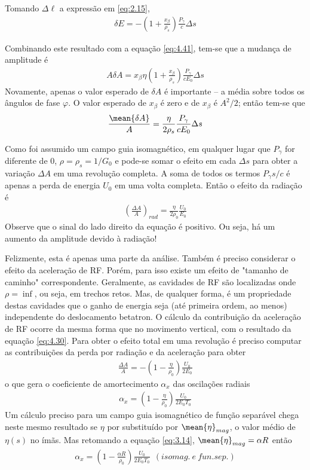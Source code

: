 Tomando $\Delta \ell$ a expressão em \eqref{eq:2.15},
\begin{align}
	\delta E = -\left(1+\frac{x_\beta}{\rho_s}\right)\frac{P_\gamma}{c}\Delta s
\end{align}

Combinando este resultado com a equação \eqref{eq:4.41}, tem-se que a mudança de amplitude é
\begin{align}
	A \delta A = x_\beta \eta \left(1+\frac{x_\beta}{\rho_s}\right)\frac{P_\gamma}{cE_0}\Delta s
\end{align}
Novamente, apenas o valor esperado de $\delta A$ é importante -- a média sobre todos os ângulos de fase $\varphi$. O valor esperado de $x_\beta$ é zero e de $x_\beta$ é $A^2/2$; então tem-se que
\begin{align}
	\frac{\mean{\delta A}}{A} = \frac{\eta}{2 \rho_s}\frac{P_\gamma}{cE_0}\Delta s
\end{align}

Como foi assumido um campo guia isomagnético, em qualquer lugar que $P_\gamma$ for diferente de 0, $\rho = \rho_s = 1/G_0$ e pode-se somar o efeito em cada $\Delta s$ para obter a variação $\Delta A$ em uma revolução completa. A soma de todos os termos $P_\gamma s/c$ é apenas a perda de energia $U_0$ em uma volta completa. Então o efeito da radiação é
\begin{align}
	\left(\frac{\Delta A}{A}\right)_{rad} = \frac{\eta}{2 \rho_0}\frac{U_0}{E_0}
\end{align}
Observe que o sinal do lado direito da equação é positivo. Ou seja, há um aumento da amplitude devido à radiação!

Felizmente, esta é apenas uma parte da análise. Também é preciso considerar o efeito da aceleração de RF. Porém, para isso existe um efeito de "tamanho de caminho" correspondente. Geralmente, as cavidades de RF são localizadas onde $\rho = \inf$, ou seja, em trechos retos. Mas, de qualquer forma, é um propriedade destas cavidades que o ganho de energia seja (até primeira ordem, ao menos) independente do deslocamento betatron. O cálculo da contribuição da aceleração de RF ocorre da mesma forma que no movimento vertical, com o resultado da equação \eqref{eq:4.30}. Para obter o efeito total em uma revolução é preciso computar as contribuições da perda por radiação e da aceleração para obter
\begin{align}
	\frac{\Delta A}{A} = -\left(1-\frac{\eta}{\rho_0}\right)\frac{U_0}{2E_0}
\end{align}
o que gera o coeficiente de amortecimento $\alpha_x$ das oscilações radiais
\begin{align}
	\alpha_x = \left(1-\frac{\eta}{\rho_0}\right)\frac{U_0}{2E_0T_0}\label{eq:4.48}
\end{align}
Um cálculo preciso para um campo guia isomagnético de função separável chega neste mesmo resultado se $\eta$ por substituído por $\mean{\eta}_{mag}$, o valor médio de $\eta(s)$ no ímãs. Mas retomando a equação \eqref{eq:3.14}, $\mean{\eta}_{mag} = \alpha R$ então
\begin{align}
	\alpha_x = \left(1-\frac{\alpha R}{\rho_0}\right)\frac{U_0}{2E_0T_0}\ \ (isomag.\ e\ fun. sep.)\label{eq:4.49}
\end{align}

